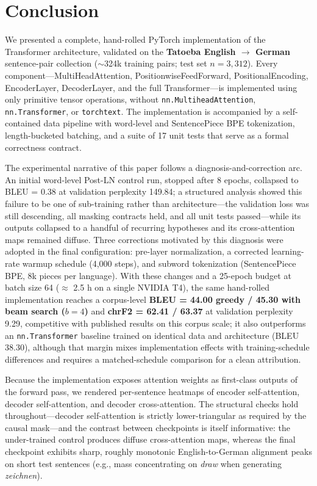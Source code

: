 \section{Conclusion}

We presented a complete, hand-rolled PyTorch implementation of the Transformer architecture, validated on the \textbf{Tatoeba English $\rightarrow$ German} sentence-pair collection ($\sim$324k training pairs; test set $n = 3{,}312$). Every component---MultiHeadAttention, PositionwiseFeedForward, PositionalEncoding, EncoderLayer, DecoderLayer, and the full Transformer---is implemented using only primitive tensor operations, without \texttt{nn.MultiheadAttention}, \texttt{nn.Transformer}, or \texttt{torchtext}. The implementation is accompanied by a self-contained data pipeline with word-level and SentencePiece BPE tokenization, length-bucketed batching, and a suite of 17 unit tests that serve as a formal correctness contract.

The experimental narrative of this paper follows a diagnosis-and-correction arc. An initial word-level Post-LN control run, stopped after 8 epochs, collapsed to BLEU = 0.38 at validation perplexity 149.84; a structured analysis showed this failure to be one of sub-training rather than architecture---the validation loss was still descending, all masking contracts held, and all unit tests passed---while its outputs collapsed to a handful of recurring hypotheses and its cross-attention maps remained diffuse. Three corrections motivated by this diagnosis were adopted in the final configuration: pre-layer normalization, a corrected learning-rate warmup schedule (4{,}000 steps), and subword tokenization (SentencePiece BPE, 8k pieces per language). With these changes and a 25-epoch budget at batch size 64 ($\approx$ 2.5 h on a single NVIDIA T4), the same hand-rolled implementation reaches a corpus-level \textbf{BLEU = 44.00 greedy / 45.30 with beam search ($b=4$)} and \textbf{chrF2 = 62.41 / 63.37} at validation perplexity 9.29, competitive with published results on this corpus scale; it also outperforms an \texttt{nn.Transformer} baseline trained on identical data and architecture (BLEU 38.30), although that margin mixes implementation effects with training-schedule differences and requires a matched-schedule comparison for a clean attribution.

Because the implementation exposes attention weights as first-class outputs of the forward pass, we rendered per-sentence heatmaps of encoder self-attention, decoder self-attention, and decoder cross-attention. The structural checks hold throughout---decoder self-attention is strictly lower-triangular as required by the causal mask---and the contrast between checkpoints is itself informative: the under-trained control produces diffuse cross-attention maps, whereas the final checkpoint exhibits sharp, roughly monotonic English-to-German alignment peaks on short test sentences (e.g., mass concentrating on \textit{draw} when generating \textit{zeichnen}).

